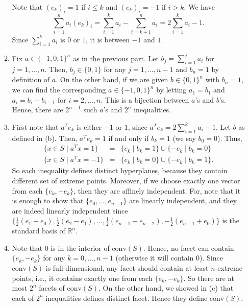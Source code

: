 \documentclass[12pt]{article}
\begin{document}
\begin{enumerate}
\begin{enumerate}
Note that $(e_k)_i = 1$ if $i \leq k$ and $(e_k)_i=-1$ if $i > k$. We have
$$
\sum_{i=1}^n a_i (e_k)_i = \sum_{i=1}^k a_i - \sum_{i=k+1}^n a_i = 2\sum_{i=1}^k a_i - 1.
$$
Since $\sum_{i=1}^k a_i$ is $0$ or $1$, it is between $-1$ and $1$.

\item Fix $a \in \{-1, 0, 1\}^n$ as in the previous part. Let $b_j = \sum_{i=1}^j a_i$ for $j=1,\dotsc,n$. Then, $b_j \in \{0, 1\}$ for any $j=1,\dotsc,n-1$ and $b_n = 1$ by definition of $a$. On the other hand, if we are given $b \in \{0, 1\}^n$ with $b_n = 1$, we can find the corresponding $a \in \{-1, 0, 1\}^n$ by letting $a_1 = b_1$ and $a_i = b_{i}-b_{i-1}$ for $i=2,\dotsc,n$. This is a bijection between $a$'s and $b$'s. Hence, there are $2^{n-1}$ such $a$'s and $2^n$ inequalities.

\item First note that $a^T e_k$ is either $-1$ or $1$, since $a^T e_k = 2\sum_{i=1}^k a_i -1$. Let $b$ as defined in (b). Then, $a^T e_k = 1$ if and only if $b_k = 1$ (we say $b_0 = 0$). Thus,
\begin{eqnarray*}
\{x \in S \mid a^T x = 1\} &=& \{e_k \mid b_k = 1\} \cup \{-e_k \mid b_k = 0\} \\
\{x \in S \mid a^T x = -1\} &=& \{e_k \mid b_k = 0\} \cup \{-e_k \mid b_k = 1\}.
\end{eqnarray*}
So each inequality defines distinct hyperplanes, because they contain different set of extreme points. Moreover, if we choose exactly one vector from each $\{e_k, -e_k\}$, then they are affinely independent. For, note that it is enough to show that $\{e_0, \dotsc, e_{n-1}\}$ are linearly independent, and they are indeed linearly independent since $\{\frac12(e_1 - e_0), \frac12(e_2-e_1), \dotsc, \frac12(e_{n-1}-e_{n-2}), -\frac12(e_{n-1}+e_0)\}$ is the standard basis of $\mathbb{R}^n$.

\item Note that $0$ is in the interior of $\mathrm{conv}(S)$. Hence, no facet can contain $\{e_k, -e_k\}$ for any $k=0,\dotsc,n-1$ (otherwise it will contain $0$). Since $\mathrm{conv}(S)$ is full-dimensional, any facet should contain at least $n$ extreme points, i.e., it contains exactly one from each $\{e_k, -e_k\}$. So there are at most $2^n$ facets of $\mathrm{conv}(S)$. On the other hand, we showed in (c) that each of $2^n$ inequalities defines distinct facet. Hence they define $\mathrm{conv}(S)$.
\end{enumerate}

\end{enumerate}
\end{document}
